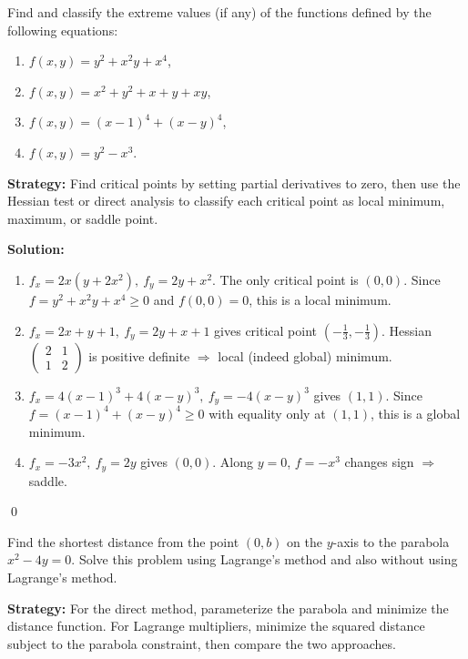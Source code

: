 \begin{problembox}
Find and classify the extreme values (if any) of the functions defined by the following equations:
\begin{enumerate}[label=(\alph*)]
    \item \( f(x, y) = y^2 + x^2y + x^4 \),
    \item \( f(x, y) = x^2 + y^2 + x + y + xy \),
    \item \( f(x, y) = (x - 1)^4 + (x - y)^4 \),
    \item \( f(x, y) = y^2 - x^3 \).
\end{enumerate}
\end{problembox}

\noindent\textbf{Strategy:} Find critical points by setting partial derivatives to zero, then use the Hessian test or direct analysis to classify each critical point as local minimum, maximum, or saddle point.

\bigskip\noindent\textbf{Solution:}
\begin{enumerate}[label=(\alph*)]
    \item $f_x=2x(y+2x^2),\ f_y=2y+x^2$. The only critical point is $(0,0)$. Since $f=y^2+x^2y+x^4\ge 0$ and $f(0,0)=0$, this is a local minimum.
    \item $f_x=2x+y+1,\ f_y=2y+x+1$ gives critical point $(-\tfrac13,-\tfrac13)$. Hessian $\begin{pmatrix}2&1\\1&2\end{pmatrix}$ is positive definite $\Rightarrow$ local (indeed global) minimum.
    \item $f_x=4(x-1)^3+4(x-y)^3,\ f_y=-4(x-y)^3$ gives $(1,1)$. Since $f=(x-1)^4+(x-y)^4\ge0$ with equality only at $(1,1)$, this is a global minimum.
    \item $f_x=-3x^2,\ f_y=2y$ gives $(0,0)$. Along $y=0$, $f=-x^3$ changes sign $\Rightarrow$ saddle.
\end{enumerate}\qed


\begin{problembox}
Find the shortest distance from the point \((0, b)\) on the \( y \)-axis to the parabola \( x^2 - 4y = 0 \). Solve this problem using Lagrange's method and also without using Lagrange's method.
\end{problembox}

\noindent\textbf{Strategy:} For the direct method, parameterize the parabola and minimize the distance function. For Lagrange multipliers, minimize the squared distance subject to the parabola constraint, then compare the two approaches.

